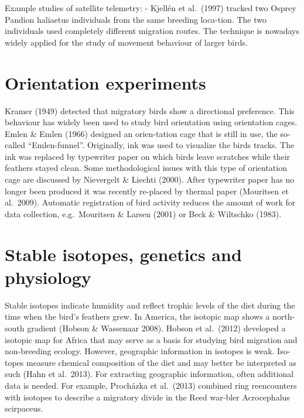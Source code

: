 \documentclass[
]{book}
\begin{document}
Example studies of satellite telemetry:
- Kjellén et al.~(1997) tracked two Osprey Pandion haliaetus individuals from the same breeding loca-tion. The two individuals used completely different migration routes. The technique is nowadays widely applied for the study of movement behaviour of larger birds.

\hypertarget{orientation-experiments}{%
\section{Orientation experiments}\label{orientation-experiments}}

Kramer (1949) detected that migratory birds show a directional preference. This behaviour has widely been used to study bird orientation using orientation cages. Emlen \& Emlen (1966) designed an orien-tation cage that is still in use, the so-called ``Emlen-funnel''. Originally, ink was used to visualize the birds tracks. The ink was replaced by typewriter paper on which birds leave scratches while their feathers stayed clean. Some methodological issues with this type of orientation cage are discussed by Nievergelt \& Liechti (2000). After typewriter paper has no longer been produced it was recently re-placed by thermal paper (Mouritsen et al.~2009). Automatic registration of bird activity reduces the amount of work for data collection, e.g.~Mouritsen \& Larsen (2001) or Beck \& Wiltschko (1983).

\hypertarget{stable-isotopes-genetics-and-physiology}{%
\section{Stable isotopes, genetics and physiology}\label{stable-isotopes-genetics-and-physiology}}

Stable isotopes indicate humidity and reflect trophic levels of the diet during the time when the bird's feathers grew. In America, the isotopic map shows a north-south gradient (Hobson \& Wassenaar 2008). Hobson et al.~(2012) developed a isotopic map for Africa that may serve as a basis for studying bird migration and non-breeding ecology. However, geographic information in isotopes is weak. Iso-topes measure chemical composition of the diet and may better be interpreted as such (Hahn et al.~2013). For extracting geographic information, often additional data is needed. For example, Procházka et al.~(2013) combined ring reencounters with isotopes to describe a migratory divide in the Reed war-bler Acrocephalus scirpaceus.
\end{document}
